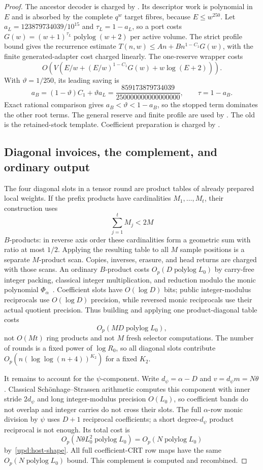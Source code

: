 \begin{proof}
The ancestor decoder is charged by .
Its descriptor work is polynomial in $E$
and is absorbed by the complete $q^w$ target fibres, because
$E\leq w^{250}$.  Let
$a_L=123879734039/10^{15}$ and $\tau_L=1-a_L$, so a port costs
$G(w)=(w+1)^{\tau_L}\operatorname{polylog}(w+2)$ per active volume.
The strict profile bound gives the recurrence estimate
$T(n,w)\leq A n+B n^{1-C_1}G(w)$, with the finite generated-adapter
cost charged linearly.  The one-reserve wrapper costs
\[
  O\!\left(V\left(E/w+(E/w)^{1-C_1}G(w)+w\log(E+2)\right)\right).
\]
With $\vartheta=1/250$, its leading saving is
\[
  a_B=(1-\vartheta)C_1+\vartheta a_L
      =\frac{859173879734039}{250000000000000000},
  \qquad \tau=1-a_B.
\]
Exact rational comparison gives $a_B<\vartheta<1-a_B$, so the stopped
term dominates the other root terms.  The general reserve and finite
profile are used by .
The old  is the retained-stock template.
Coefficient preparation is charged by .
\subsection{Diagonal invoices, the complement, and ordinary output}
\label{upd:invoice}

The four diagonal slots in a tensor round are product tables of already
prepared local weights.  If the prefix products have cardinalities
$M_1,\ldots,M_t$, their construction uses
\[
  \sum_{j=1}^t M_j<2M
\]
$B$-products: in reverse axis order these cardinalities form a geometric
sum with ratio at most $1/2$.  Applying the resulting table to all $M$
sample positions is a separate $M$-product scan.  Copies, inverses,
erasure, and head returns are charged with those scans.  An ordinary
$B$-product costs $O_p(D\operatorname{polylog}L_0)$ by carry-free integer
packing, classical integer multiplication, and reduction modulo the
monic polynomial $\Phi_\alpha$~\cite{SS71,BrentZimmermann10}.  Coefficient
slots have $O(\log D)$ bits; public integer-modulus reciprocals use
$O(\log D)$ precision, while reversed monic reciprocals use their actual
quotient precision.  Thus building and applying one product-diagonal
table costs
\[
  O_p(MD\operatorname{polylog}L_0),
\]
not $O(Mt)$ ring products and not $M$ fresh selector computations.  The
number of rounds is a fixed power of $\log R_0$, so all diagonal slots
contribute $O_p(n(\log\log(n+4))^{K_2})$ for a fixed $K_2$.

It remains to account for the $\psi$-component.  Write
$d_\psi=\alpha-D$ and $v=d_\psi m=N\theta$.  Classical Schönhage--Strassen
arithmetic computes this component with inner stride $2d_\psi$ and long
integer-modulus precision $O(L_0)$, so coefficient bands do not overlap
and integer carries do not cross their slots.  The full $\alpha$-row
monic division by $\psi$ uses $D+1$ reciprocal coefficients; a short
degree-$d_\psi$ product reciprocal is not enough.  Its total cost is
\[
  O_p(N\theta L_0^2\operatorname{polylog}L_0)
      =O_p(N\operatorname{polylog}L_0)
\]
by~\eqref{upd:host-shape}.  All full coefficient-CRT row maps have the
same $O_p(N\operatorname{polylog}L_0)$ bound.  This complement is
computed and recombined.


\end{proof}
